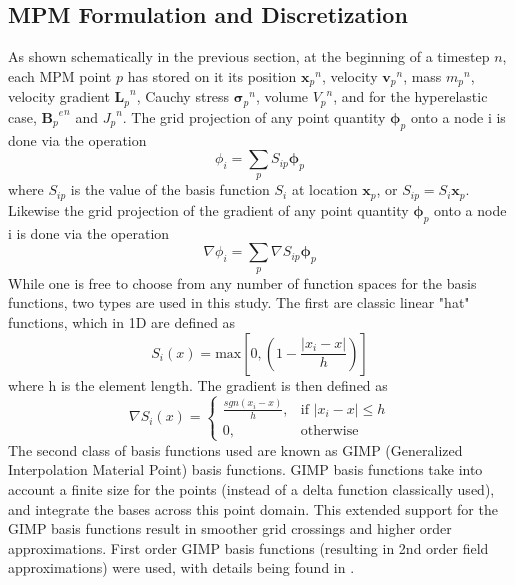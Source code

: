 \subsection{MPM Formulation and Discretization}
As shown schematically in the previous section, at the beginning of a timestep $n$, each MPM point $p$ has stored on it its position ${\bm{x}_p}^n$, velocity ${\bm{v}_p}^n$, mass ${m_p}^n$, velocity gradient ${\bm{L}_p}^n$, Cauchy stress ${\bm{\sigma}_p}^n$, volume ${V_p}^n$, and for the hyperelastic case, ${{\bm{B}_p}^e}^n$ and ${J_p}^n$. The grid projection of any point quantity $\bm{\phi}_p$ onto a node i is done via the operation
\begin{equation}
\phi_i=\sum_pS_{ip}{\bm{\phi}}_p\label{projection_value}
\end{equation}
where $S_{ip}$ is the value of the basis function $S_i$ at location $\bm{x}_p$, or $S_{ip}=S_i{\bm{x}_p}$. Likewise the grid projection of the gradient of any point quantity $\bm{\phi}_p$ onto a node i is done via the operation
\begin{equation}
\nabla \phi_i=\sum_p \nabla S_{ip}{\bm{\phi}}_p \label{projection_gradient}
\end{equation}
While one is free to choose from any number of function spaces for the basis functions, two types are used in this study. The first are classic linear "hat" functions, which in 1D are defined as
\begin{equation}
S_i(x)=\text{max}\left[0,\left(1-\frac{|x_i-x|}{h}\right)\right]\label{linear_basis}
\end{equation}
where h is the element length. The gradient is then defined as
\begin{equation}
	\nabla S_i(x)=
\begin{cases}
	\frac{sgn(x_i-x)}{h},     & \text{if } |x_i-x| \leq h \\
	0,						 & \text{otherwise}
\end{cases}
\label{linear_basis_gradient}
\end{equation}
The second class of basis functions used are known as GIMP (Generalized Interpolation Material Point) basis functions. GIMP basis functions take into account a finite size for the points (instead of a delta function classically used), and integrate the bases across this point domain. This extended support for the GIMP basis functions result in smoother grid crossings and higher order approximations. First order GIMP basis functions (resulting in 2nd order field approximations) were used, with details being found in \cite{Bardenhagen:2004}.

